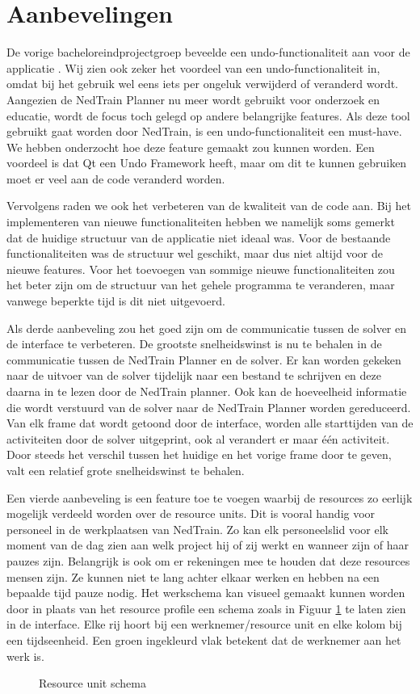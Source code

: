 \section{Aanbevelingen}
De vorige bacheloreindprojectgroep beveelde een undo-functionaliteit aan voor de applicatie \cite{bep2012nedtrain}. Wij zien ook zeker het voordeel van een undo-functionaliteit in, omdat bij het gebruik wel eens iets per ongeluk verwijderd of veranderd wordt. Aangezien de NedTrain Planner nu meer wordt gebruikt voor onderzoek en educatie, wordt de focus toch gelegd op andere belangrijke features. Als deze tool gebruikt gaat worden door NedTrain, is een undo-functionaliteit een must-have. We hebben onderzocht hoe deze feature gemaakt zou kunnen worden. Een voordeel is dat Qt een Undo Framework heeft, maar om dit te kunnen gebruiken moet er veel aan de code veranderd worden. 

Vervolgens raden we ook het verbeteren van de kwaliteit van de code aan. Bij het implementeren van nieuwe functionaliteiten hebben we namelijk soms gemerkt dat de huidige structuur van de applicatie niet ideaal was. Voor de bestaande functionaliteiten was de structuur wel geschikt, maar dus niet altijd voor de nieuwe features. Voor het toevoegen van sommige nieuwe functionaliteiten zou het beter zijn om de structuur van het gehele programma te veranderen, maar vanwege beperkte tijd is dit niet uitgevoerd.

Als derde aanbeveling zou het goed zijn om de communicatie tussen de solver en de interface te verbeteren. De grootste snelheidswinst is nu te behalen in de communicatie tussen de NedTrain Planner en de solver. Er kan worden gekeken naar de uitvoer van de solver tijdelijk naar een bestand te schrijven en deze daarna in te lezen door de NedTrain planner. Ook kan de hoeveelheid informatie die wordt verstuurd van de solver naar de NedTrain Planner worden gereduceerd. Van elk frame dat wordt getoond door de interface, worden alle starttijden van de activiteiten door de solver uitgeprint, ook al verandert er maar \'e\'en activiteit. Door steeds het verschil tussen het huidige en het vorige frame door te geven, valt een relatief grote snelheidswinst te behalen.

Een vierde aanbeveling is een feature toe te voegen waarbij de resources zo eerlijk mogelijk verdeeld worden over de resource units. Dit is vooral handig voor personeel in de werkplaatsen van NedTrain. Zo kan elk personeelslid voor elk moment van de dag zien aan welk project hij of zij werkt en wanneer zijn of haar pauzes zijn. Belangrijk is ook om er rekeningen mee te houden dat deze resources mensen zijn. Ze kunnen niet te lang achter elkaar werken en hebben na een bepaalde tijd pauze nodig. Het werkschema kan visueel gemaakt kunnen worden door in plaats van het resource profile een schema zoals in Figuur \ref{fig:schema} te laten zien in de interface. Elke rij hoort bij een werknemer/resource unit en elke kolom bij een tijdseenheid. Een groen ingekleurd vlak betekent dat de werknemer aan het werk is.

\begin{figure}[H]
\centering

\caption{Resource unit schema}
\label{fig:schema}
\end{figure}
